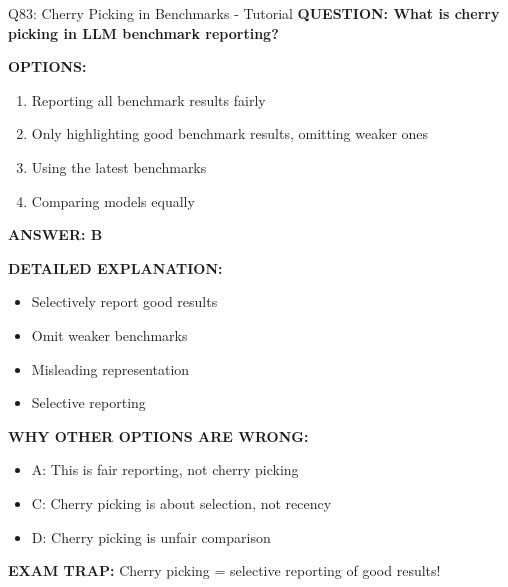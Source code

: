 \documentclass[8pt]{beamer}
\begin{document}
	\begin{frame}{Q83: Cherry Picking in Benchmarks - Tutorial}
		\fontsize{6.5}{7.5}\selectfont
		\textbf{QUESTION: What is cherry picking in LLM benchmark reporting?}
		
		\vspace{0.1cm}
		\textbf{OPTIONS:}
		\begin{enumerate}
			\item Reporting all benchmark results fairly
			\item Only highlighting good benchmark results, omitting weaker ones
			\item Using the latest benchmarks
			\item Comparing models equally
		\end{enumerate}
		
		\vspace{0.1cm}
		\textcolor{myblue}{\textbf{ANSWER: B}}
		
		\vspace{0.1cm}
		\textbf{DETAILED EXPLANATION:}
		\begin{itemize}
			\item Selectively report good results
			\item Omit weaker benchmarks
			\item Misleading representation
			\item Selective reporting
		\end{itemize}
		
		\vspace{0.1cm}
		\textcolor{myred}{\textbf{WHY OTHER OPTIONS ARE WRONG:}}
		\begin{itemize}
			\item \textcolor{myred}{A:} This is fair reporting, not cherry picking
			\item \textcolor{myred}{C:} Cherry picking is about selection, not recency
			\item \textcolor{myred}{D:} Cherry picking is unfair comparison
		\end{itemize}
		
		\textcolor{myred}{\textbf{EXAM TRAP:}} Cherry picking = \textcolor{myblue}{selective reporting} of good results!
	\end{frame}
	
\end{document}
